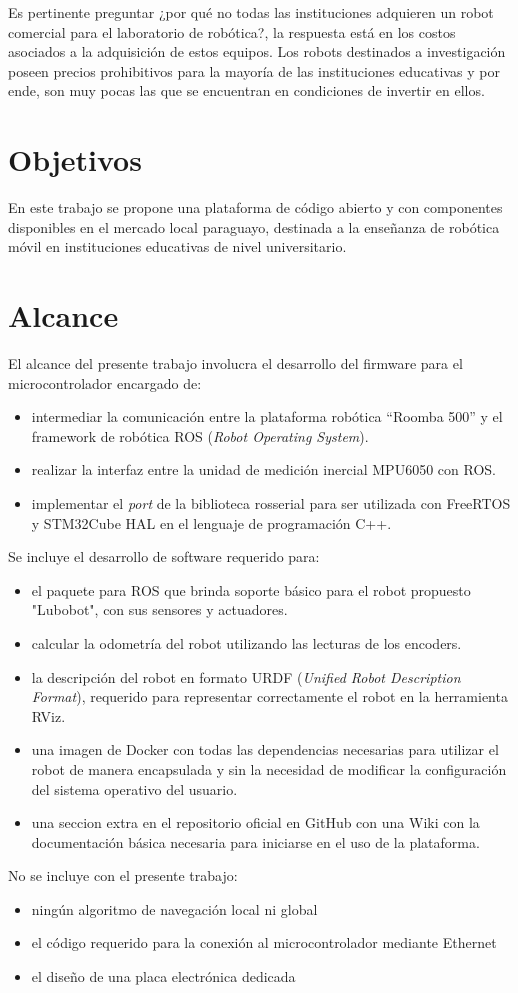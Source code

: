 Es pertinente preguntar ¿por qué no todas las instituciones adquieren un robot comercial para el laboratorio de robótica?, la respuesta está en los costos asociados a la adquisición de estos equipos. Los robots destinados a investigación poseen precios prohibitivos para la mayoría de las instituciones educativas y por ende, son muy pocas las que se encuentran en condiciones de invertir en ellos.


\section{Objetivos}

En este trabajo se propone una plataforma de código abierto y con componentes disponibles en el mercado local paraguayo, destinada a la enseñanza de robótica móvil en instituciones educativas de nivel universitario.

\section{Alcance}

El alcance del presente trabajo involucra el desarrollo del firmware para el microcontrolador encargado de:
\begin{itemize}
	\item intermediar la comunicación entre la plataforma robótica ``Roomba 500'' y el framework de robótica ROS (\textit{Robot Operating System}).
	\item realizar la interfaz entre la unidad de medición inercial MPU6050 con ROS.
	\item implementar el \textit{port} de la biblioteca rosserial para ser utilizada con FreeRTOS y STM32Cube HAL en el lenguaje de programación C++.
\end{itemize}

Se incluye el desarrollo de software requerido para:
\begin{itemize}
	\item el paquete para ROS que brinda soporte básico para el robot propuesto "Lubobot", con sus sensores y actuadores.
	\item calcular la odometría del robot utilizando las lecturas de los encoders.
	\item la descripción del robot en formato URDF (\textit{Unified Robot Description Format}), requerido para representar correctamente el robot en la herramienta RViz.
	\item una imagen de Docker con todas las dependencias necesarias para utilizar el robot de manera encapsulada y sin la necesidad de modificar la configuración del sistema operativo del usuario.
	\item una seccion extra en el repositorio oficial en GitHub con una Wiki con la documentación básica necesaria para iniciarse en el uso de la plataforma.
\end{itemize}

No se incluye con el presente trabajo:
\begin{itemize}
	\item ningún algoritmo de navegación local ni global
	\item el código requerido para la conexión al microcontrolador mediante Ethernet
	\item el diseño de una placa electrónica dedicada
\end{itemize}
